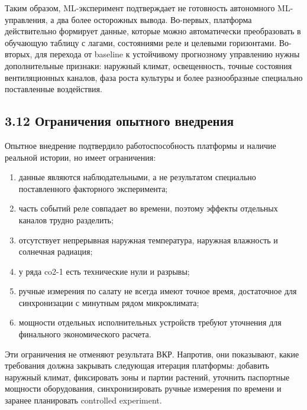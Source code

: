 \documentclass[a4paper,14pt]{extarticle}
\renewcommand{\texttt}[1]{\textnormal{#1}}
\providecommand{\tightlist}{%
  \setlength{\itemsep}{0pt}\setlength{\parskip}{0pt}}
\begin{document}
Таким образом, ML-эксперимент подтверждает не готовность автономного
ML-управления, а два более осторожных вывода. Во-первых, платформа
действительно формирует данные, которые можно автоматически
преобразовать в обучающую таблицу с лагами, состояниями реле и целевыми
горизонтами. Во-вторых, для перехода от baseline к устойчивому
прогнозному управлению нужны дополнительные признаки: наружный климат,
освещенность, точные состояния вентиляционных каналов, фаза роста
культуры и более разнообразные специально поставленные воздействия.

\hypertarget{ux43eux433ux440ux430ux43dux438ux447ux435ux43dux438ux44f-ux43eux43fux44bux442ux43dux43eux433ux43e-ux432ux43dux435ux434ux440ux435ux43dux438ux44f}{%
\subsection{3.12 Ограничения опытного
внедрения}\label{ux43eux433ux440ux430ux43dux438ux447ux435ux43dux438ux44f-ux43eux43fux44bux442ux43dux43eux433ux43e-ux432ux43dux435ux434ux440ux435ux43dux438ux44f}}

Опытное внедрение подтвердило работоспособность платформы и наличие
реальной истории, но имеет ограничения:

\begin{enumerate}
\def\labelenumi{\arabic{enumi})}
\tightlist
\item
  данные являются наблюдательными, а не результатом специально
  поставленного факторного эксперимента;
\item
  часть событий реле совпадает во времени, поэтому эффекты отдельных
  каналов трудно разделить;
\item
  отсутствует непрерывная наружная температура, наружная влажность и
  солнечная радиация;
\item
  у ряда \texttt{co2-1} есть технические нули и разрывы;
\item
  ручные измерения по салату не всегда имеют точное время, достаточное
  для синхронизации с минутным рядом микроклимата;
\item
  мощности отдельных исполнительных устройств требуют уточнения для
  финального экономического расчета.
\end{enumerate}

Эти ограничения не отменяют результата ВКР. Напротив, они показывают,
какие требования должна закрывать следующая итерация платформы: добавить
наружный климат, фиксировать зоны и партии растений, уточнить паспортные
мощности оборудования, синхронизировать ручные измерения по времени и
заранее планировать controlled experiment.
\end{document}
